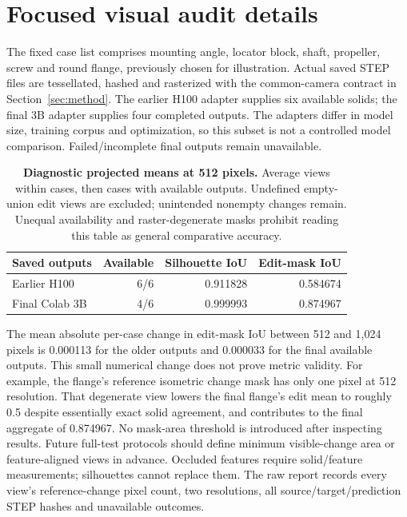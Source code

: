 \section{Focused visual audit details}
\label{sec:visual-audit}
The fixed case list comprises mounting angle, locator block, shaft, propeller, screw and round flange, previously chosen for illustration. Actual saved STEP files are tessellated, hashed and rasterized with the common-camera contract in Section~\ref{sec:method}. The earlier H100 adapter supplies six available solids; the final 3B adapter supplies four completed outputs. The adapters differ in model size, training corpus and optimization, so this subset is not a controlled model comparison. Failed/incomplete final outputs remain unavailable.
\begin{table}[h]
\centering\scriptsize
\begin{tabular}{lrrr}
\toprule
Saved outputs & Available & Silhouette IoU & Edit-mask IoU \\
\midrule
Earlier H100 & 6/6 & 0.911828 & 0.584674 \\
Final Colab 3B & 4/6 & 0.999993 & 0.874967 \\
\bottomrule
\end{tabular}
\caption{\textbf{Diagnostic projected means at 512 pixels.} Average views within cases, then cases with available outputs. Undefined empty-union edit views are excluded; unintended nonempty changes remain. Unequal availability and raster-degenerate masks prohibit reading this table as general comparative accuracy.}
\label{tab:visual-audit}
\end{table}
The mean absolute per-case change in edit-mask IoU between 512 and 1,024 pixels is 0.000113 for the older outputs and 0.000033 for the final available outputs. This small numerical change does not prove metric validity. For example, the flange's reference isometric change mask has only one pixel at 512 resolution. That degenerate view lowers the final flange's edit mean to roughly 0.5 despite essentially exact solid agreement, and contributes to the final aggregate of 0.874967. No mask-area threshold is introduced after inspecting results. Future full-test protocols should define minimum visible-change area or feature-aligned views in advance. Occluded features require solid/feature measurements; silhouettes cannot replace them. The raw report records every view's reference-change pixel count, two resolutions, all source/target/prediction STEP hashes and unavailable outcomes.

